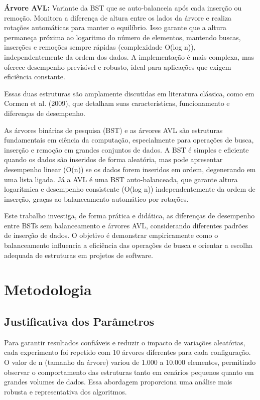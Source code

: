 \documentclass[12pt,a4paper]{article}
\begin{document}
\textbf{Árvore AVL:} Variante da BST que se auto-balanceia após cada inserção ou remoção. Monitora a diferença de altura entre os lados da árvore e realiza rotações automáticas para manter o equilíbrio. Isso garante que a altura permaneça próxima ao logaritmo do número de elementos, mantendo buscas, inserções e remoções sempre rápidas (complexidade O(log n)), independentemente da ordem dos dados. A implementação é mais complexa, mas oferece desempenho previsível e robusto, ideal para aplicações que exigem eficiência constante.

Essas duas estruturas são amplamente discutidas em literatura clássica, como em Cormen et al. (2009)\cite{cormen2009}, que detalham suas características, funcionamento e diferenças de desempenho.

As árvores binárias de pesquisa (BST) e as árvores AVL são estruturas fundamentais em ciência da computação, especialmente para operações de busca, inserção e remoção em grandes conjuntos de dados. A BST é simples e eficiente quando os dados são inseridos de forma aleatória, mas pode apresentar desempenho linear (O(n)) se os dados forem inseridos em ordem, degenerando em uma lista ligada. Já a AVL é uma BST auto-balanceada, que garante altura logarítmica e desempenho consistente (O(log n)) independentemente da ordem de inserção, graças ao balanceamento automático por rotações.

Este trabalho investiga, de forma prática e didática, as diferenças de desempenho entre BSTs sem balanceamento e árvores AVL, considerando diferentes padrões de inserção de dados. O objetivo é demonstrar empiricamente como o balanceamento influencia a eficiência das operações de busca e orientar a escolha adequada de estruturas em projetos de software.

\section{Metodologia}

\subsection*{Justificativa dos Parâmetros}
Para garantir resultados confiáveis e reduzir o impacto de variações aleatórias, cada experimento foi repetido com 10 árvores diferentes para cada configuração. O valor de n (tamanho da árvore) variou de 1.000 a 10.000 elementos, permitindo observar o comportamento das estruturas tanto em cenários pequenos quanto em grandes volumes de dados. Essa abordagem proporciona uma análise mais robusta e representativa dos algoritmos.
\end{document}
